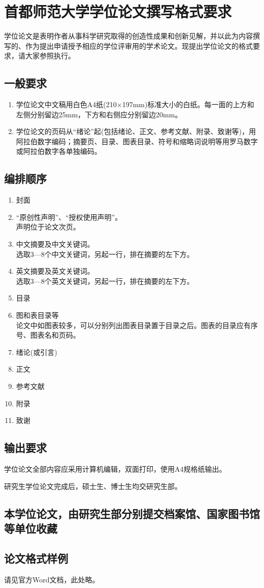 ﻿\chapter{首都师范大学学位论文撰写格式要求}
\label{cha:engorg}
学位论文是表明作者从事科学研究取得的创造性成果和创新见解，并以此为内容撰写的、作为提出申请授予相应的学位评审用的学术论文。现提出学位论文的格式要求，请大家参照执行。

\section{一般要求}
\begin{enumerate}
\item 学位论文中文稿用白色A4纸(210×197mm)标准大小的白纸。每一面的上方和左侧分别留边25mm，下方和右侧应分别留边20mm。

\item 学位论文的页码从“绪论”起(包括绪论、正文、参考文献、附录、致谢等)，用阿拉伯数字编码；摘要页、目录、图表目录、符号和缩略词说明等用罗马数字或阿拉伯数字各单独编码。
\end{enumerate}

\section{编排顺序}
\begin{enumerate}
\item 封面
\item “原创性声明”、“授权使用声明”。\\
声明位于论文次页。
\item 中文摘要及中文关键词。\\
选取3—8个中文关键词，另起一行，排在摘要的左下方。
\item 英文摘要及英文关键词。\\
选取3—8个英文关键词，另起一行，排在摘要的左下方。
\item 目录
\item 图和表目录等\\
论文中如图表较多，可以分别列出图表目录置于目录之后。图表的目录应有序号、图表名和页码。
\item 绪论(或引言)
\item 正文
\item 参考文献
\item 附录
\item 致谢
\end{enumerate}
\section{输出要求}

学位论文全部内容应采用计算机编辑，双面打印，使用A4规格纸输出。\par

研究生学位论文完成后，硕士生、博士生均交研究生部。

\section{本学位论文，由研究生部分别提交档案馆、国家图书馆等单位收藏}
\section{论文格式样例}
请见官方Word文档，此处略。
